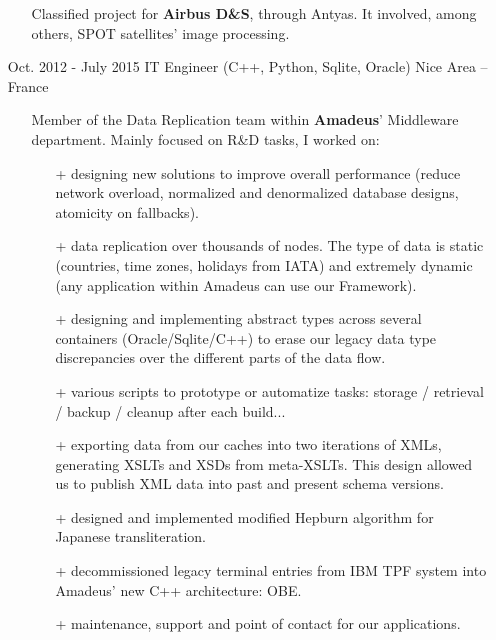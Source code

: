 \documentclass{res}
\begin{document}
\begin{resume}
\begin{itemize}
												\begin{itemize}
																\item[] Classified project for \textbf{Airbus D\&S}, through Antyas. It involved, among others, SPOT satellites' image processing.
												\end{itemize}
                \item[] Oct. 2012 - July 2015 \tabto{5cm} IT Engineer (C++, Python, Sqlite, Oracle) \hfill Nice Area -- France
                \begin{itemize}
                        \item[] Member of the Data Replication team within \textbf{Amadeus}' Middleware department. Mainly focused on R\&D tasks, I worked on:
                        \begin{itemize}
                                \item[+] designing new solutions to improve overall performance (reduce network overload, normalized and denormalized database designs, atomicity on fallbacks).
                                \item[+] data replication over thousands of nodes. The type of data is static (countries, time zones, holidays from IATA) and extremely dynamic (any application within Amadeus can use our Framework).
                                \item[+] designing and implementing abstract types across several containers (Oracle/Sqlite/C++) to erase our legacy data type discrepancies over the different parts of the data flow.
                                \item[+] various scripts to prototype or automatize tasks: storage / retrieval / backup / cleanup after each build...
                                \item[+] exporting data from our caches into two iterations of XMLs, generating XSLTs and XSDs from meta-XSLTs. This design allowed us to publish XML data into past and present schema versions.
																\item[+] designed and implemented modified Hepburn algorithm for Japanese transliteration.
																\item[+] decommissioned legacy terminal entries from IBM TPF system into Amadeus' new C++ architecture: OBE.
                                \item[+] maintenance, support and point of contact for our applications.
                        \end{itemize}
                \end{itemize}

\end{itemize}
\end{resume}
\end{document}
